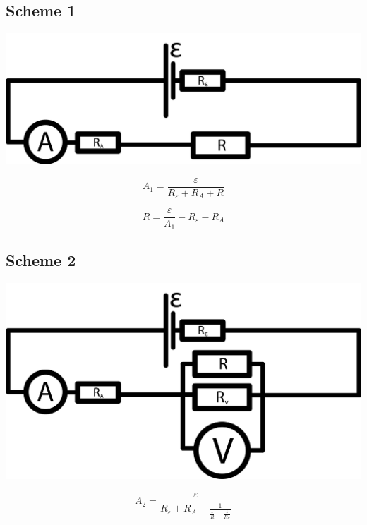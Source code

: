 \documentclass[11pt]{memoir}
\begin{document}
    \begin{center}
    \subsection{Scheme 1}\label{subsec:scheme-1}
        \includegraphics[width=\linewidth]{../schemes/Scheme1.png}

            \begin{equation*}
                A_1 = \frac{\varepsilon}{R_\varepsilon + R_A + R}
            \end{equation*}

            \begin{equation}\label{eq:equation1}
                R = \frac{\varepsilon}{A_1} - R_\varepsilon - R_A
            \end{equation}
    \end{center}


    \newpage

    \subsection{Scheme 2}\label{subsec:scheme-2}

    \includegraphics[width=\linewidth]{../schemes/Scheme2.png}

    \begin{equation*}
        A_2 = \frac{\varepsilon}{R_\varepsilon + R_A + \frac{1}{\frac{1}{R} + \frac{1}{R_V}}}
    \end{equation*}
\end{document}
